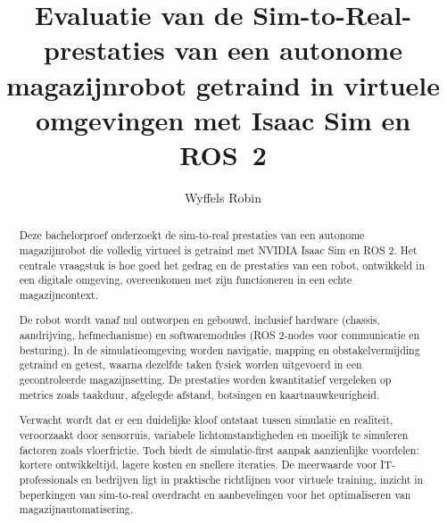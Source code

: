 \documentclass{hogent-article}
\title{Evaluatie van de Sim{-}to{-}Real{-}prestaties van een autonome magazijnrobot getraind in virtuele omgevingen met Isaac Sim en ROS~2}
\author{Wyffels Robin}
\begin{document}
\begin{abstract}
Deze bachelorproef onderzoekt de sim-to-real prestaties van een autonome magazijnrobot die volledig virtueel is getraind met NVIDIA Isaac Sim en ROS 2. Het centrale vraagstuk is hoe goed het gedrag en de prestaties van een robot, ontwikkeld in een digitale omgeving, overeenkomen met zijn functioneren in een echte magazijncontext.

De robot wordt vanaf nul ontworpen en gebouwd, inclusief hardware (chassis, aandrijving, hefmechanisme) en softwaremodules (ROS 2-nodes voor communicatie en besturing). In de simulatieomgeving worden navigatie, mapping en obstakelvermijding getraind en getest, waarna dezelfde taken fysiek worden uitgevoerd in een gecontroleerde magazijnsetting. De prestaties worden kwantitatief vergeleken op metrics zoals taakduur, afgelegde afstand, botsingen en kaartnauwkeurigheid.

Verwacht wordt dat er een duidelijke kloof ontstaat tussen simulatie en realiteit, veroorzaakt door sensorruis, variabele lichtomstandigheden en moeilijk te simuleren factoren zoals vloerfrictie. Toch biedt de simulatie-first aanpak aanzienlijke voordelen: kortere ontwikkeltijd, lagere kosten en snellere iteraties. De meerwaarde voor IT-professionals en bedrijven ligt in praktische richtlijnen voor virtuele training, inzicht in beperkingen van sim-to-real overdracht en aanbevelingen voor het optimaliseren van magazijnautomatisering.
\end{abstract}

\tableofcontents



\nocite{Macenski2022,OpenNavigation2025,NVIDIA2025,IsaacLab2025,Makoviychuk2021}
\printbibliography[heading=bibintoc,section=0]
\end{document}

